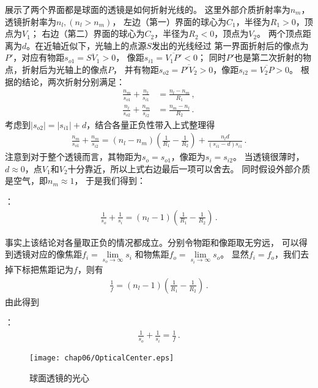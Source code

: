 展示了两个界面都是球面的透镜是如何折射光线的。
这里外部介质折射率为$n_m$，透镜折射率为$n_l, (n_l>n_m)$，
左边（第一）界面的球心为$C_1$，半径为$R_1>0$，顶点为$V_1$；
右边（第二）界面的球心为$C_2$，半径为$R_2<0$，顶点为$V_2$。
两个顶点距离为$d$。在近轴近似下，光轴上的点源$S$发出的光线经过
第一界面折射后的像点为$P'$，对应有物距$s_{o1}=\overline{SV_1}>0$，
像距$s_{i1}=\overline{V_1P'}<0$；
同时$P'$也是第二次折射的物点，折射后为光轴上的像点$P$，
并有物距$s_{o2}=\overline{P'V_2}>0$，像距$s_{i2}=\overline{V_2P}>0$。
根据的结论，两次折射分别满足：
\begin{align}
    \frac{n_m}{s_{o1}}+\frac{n_l}{s_{i1}} & =\frac{n_l-n_m}{R_1}\, , \\
    \frac{n_l}{s_{o2}}+\frac{n_m}{s_{i2}} & =\frac{n_m-n_l}{R_2}\, .
\end{align}
考虑到$|s_{o2}|=|s_{i1}|+d$，结合各量正负性带入上式整理得
\begin{align}
    \frac{n_m}{s_{o1}}+\frac{n_m}{s_{i2}}=(n_l-n_m)\left(\frac{1}{R_1}-\frac{1}{R_2}\right)+\frac{n_ld}{(s_{i1}-d)s_{i1}}\, .
\end{align}
注意到对于整个透镜而言，其物距为$s_o=s_{o1}$，像距为$s_i=s_{i2}$。
当透镜很薄时，$d\approx 0$，点$V_1$和$V_2$十分靠近，所以上式右边最后一项可以舍去。
同时假设外部介质是空气，即$n_m\approx 1$，
于是我们得到：
\begin{proposition}
    ：
    \begin{align}
        \frac{1}{s_o}+\frac{1}{s_i}=(n_l-1)\left(\frac{1}{R_1}-\frac{1}{R_2}\right)\, .
    \end{align}
\end{proposition}

事实上该结论对各量取正负的情况都成立。分别令物距和像距取无穷远，
可以得到透镜对应的像焦距$f_i=\lim\limits_{s_o\to\infty}s_i$
和物焦距$f_o=\lim\limits_{s_i\to\infty}s_o$。
显然$f_i=f_o$，我们去掉下标把焦距记为$f$，则有
\begin{align}
    \frac{1}{f}=(n_l-1)\left(\frac{1}{R_1}-\frac{1}{R_2}\right)\, .
\end{align}
由此得到
\begin{proposition}
    ：
    \begin{align}
        \frac{1}{s_o}+\frac{1}{s_i}=\frac{1}{f}\, .
    \end{align}
\end{proposition}

\begin{figure}[htbp]
    \centering\texttt{[image: chap06/OpticalCenter.eps]}
    \caption{球面透镜的光心}
    \label{fig:6.35}
\end{figure}


